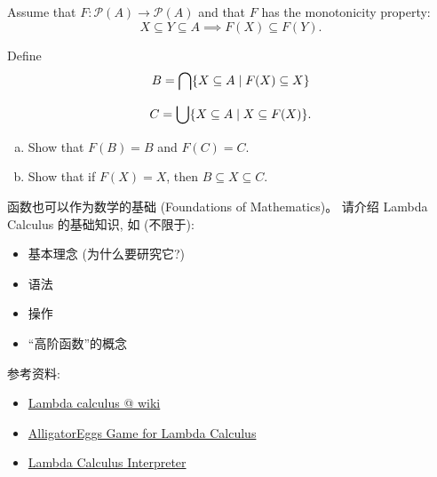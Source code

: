 \documentclass[a4paper, justified]{tufte-handout}
\begin{document}
\begin{problem}[Monotonicity]
  Assume that $F: \mathcal{P}(A) \to \mathcal{P}(A)$ and that $F$ has the monotonicity property:
  \[
    X \subseteq Y \subseteq A \implies F(X) \subseteq F(Y).
  \]

  \noindent Define
  \[
    B = \bigcap \{X \subseteq A \mid F(X) \subseteq X\}
  \]

  \[
    C = \bigcup \{X \subseteq A \mid X \subseteq F(X)\}.
  \]

  \begin{enumerate}[(a)]
    \item Show that $F(B) = B$ and $F(C) = C$.
    \item Show that if $F(X) = X$, then $B \subseteq X \subseteq C$.
  \end{enumerate}
\end{problem}

\begin{solution}
\end{solution}

\beginot

\begin{ot}

  函数也可以作为数学的基础 (Foundations of Mathematics)。
  请介绍 Lambda Calculus 的基础知识, 如 (不限于):
  \begin{itemize}
    \item 基本理念 (为什么要研究它?)
    \item 语法 
    \item 操作
    \item ``高阶函数''的概念
  \end{itemize}

  \noindent 参考资料:
  \begin{itemize}
    \item \href{https://en.wikipedia.org/wiki/Lambda\_calculus}{Lambda calculus @ wiki}
    \item \href{http://worrydream.com/AlligatorEggs/}{AlligatorEggs Game for Lambda Calculus}
    \item \href{https://jacksongl.github.io/files/demo/lambda/index.htm}{Lambda Calculus Interpreter}
  \end{itemize}
\end{ot}
\end{document}
